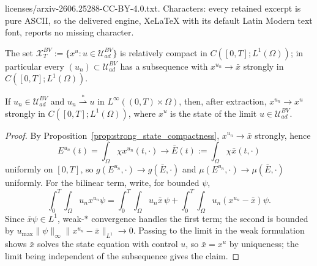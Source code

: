 \documentclass[10pt,a4paper]{amsart}
\newcommand{\Om}{\Omega}
\newcommand{\UadBV}{\mathcal{U}_{ad}^{BV}}
\begin{document}
licenses/arxiv-2606.25288-CC-BY-4.0.txt. Characters: every retained excerpt is pure ASCII, so the delivered engine, XeLaTeX with its default Latin Modern text font, reports no missing character.
\begin{proposition}
\label{prop:strong_state_compactness}
The set $\mathcal X_T^{BV}:=\{x^u:u\in\UadBV\}$ is relatively compact in
$C([0,T];L^1(\Om))$; in particular every $(u_n)\subset\UadBV$ has a subsequence
with $x^{u_n}\to\bar x$ strongly in $C([0,T];L^1(\Om))$.
\end{proposition}

\begin{proposition}
\label{prop:control_state_closed}
If $u_n\in\UadBV$ and $u_n\overset{\ast}{\rightharpoonup}u$ in
$L^\infty((0,T)\times\Om)$, then, after extraction, $x^{u_n}\to x^u$ strongly in
$C([0,T];L^1(\Om))$, where $x^u$ is the state of the limit $u\in\UadBV$.
\end{proposition}

\begin{proof}
By Proposition~\ref{prop:strong_state_compactness}, $x^{u_n}\to\bar x$ strongly,
hence
\[
E^{u_n}(t)=\int_\Om\chi x^{u_n}(t,\cdot)
\longrightarrow
\bar E(t):=\int_\Om\chi\bar x(t,\cdot)
\]
uniformly on $[0,T]$, so $g(E^{u_n},\cdot)\to g(\bar E,\cdot)$ and
$\mu(E^{u_n},\cdot)\to\mu(\bar E,\cdot)$ uniformly. For the bilinear term, write,
for bounded $\psi$,
\[
\int_0^T\!\!\int_\Om u_n x^{u_n}\psi
=
\int_0^T\!\!\int_\Om u_n\bar x\,\psi
+\int_0^T\!\!\int_\Om u_n(x^{u_n}-\bar x)\psi.
\]
Since $\bar x\psi\in L^1$, weak-$\ast$ convergence handles the first term; the
second is bounded by $u_{\max}\|\psi\|_\infty\|x^{u_n}-\bar x\|_{L^1}\to0$. Passing
to the limit in the weak formulation shows $\bar x$ solves the state equation with
control $u$, so $\bar x=x^u$ by uniqueness; the limit being independent of the
subsequence gives the claim.
\end{proof}
\end{document}

